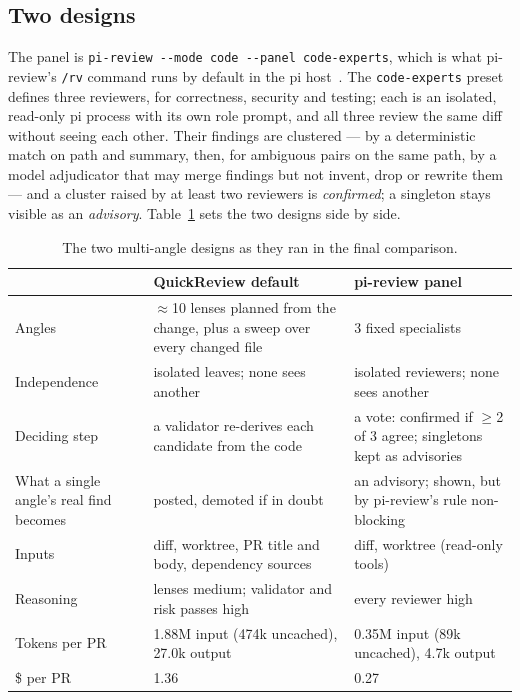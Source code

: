 \documentclass[11pt,a4paper]{article}
\newcommand{\qcr}{QuickReview}
\newcommand{\code}[1]{\texttt{#1}}
\begin{document}
\subsection{Two designs}

The panel is \code{pi-review -{}-mode code -{}-panel code-experts}, which is
what pi-review's \code{/rv} command runs by default in the pi
host~\cite{pireview,pi}. The \code{code-experts} preset defines three
reviewers, for correctness, security and testing; each is an isolated,
read-only pi process with its own role prompt, and all three review the same
diff without seeing each other. Their findings are clustered --- by a
deterministic match on path and summary, then, for ambiguous pairs on the
same path, by a model adjudicator that may merge findings but not invent,
drop or rewrite them --- and a cluster raised by at least two reviewers is
\emph{confirmed}; a singleton stays visible as an \emph{advisory}.
Table~\ref{tab:designs} sets the two designs side by side.

\begin{table}[!htbp]
\centering
\small
\caption{The two multi-angle designs as they ran in the final comparison.}
\label{tab:designs}
\begin{tabularx}{\textwidth}{@{}l X X@{}}
\toprule
& \qcr{} default & pi-review panel \\
\midrule
Angles & $\approx$10 lenses planned from the change, plus a sweep over every changed file & 3 fixed specialists \\
Independence & isolated leaves; none sees another & isolated reviewers; none sees another \\
Deciding step & a validator re-derives each candidate from the code & a vote: confirmed if $\ge$2 of 3 agree; singletons kept as advisories \\
What a single angle's real find becomes & posted, demoted if in doubt & an advisory; shown, but by pi-review's rule non-blocking \\
Inputs & diff, worktree, PR title and body, dependency sources & diff, worktree (read-only tools) \\
Reasoning & lenses medium; validator and risk passes high & every reviewer high \\
Tokens per PR & 1.88M input (474k uncached), 27.0k output & 0.35M input (89k uncached), 4.7k output \\
\$ per PR & 1.36 & 0.27 \\
\bottomrule
\end{tabularx}
\end{table}
\end{document}
